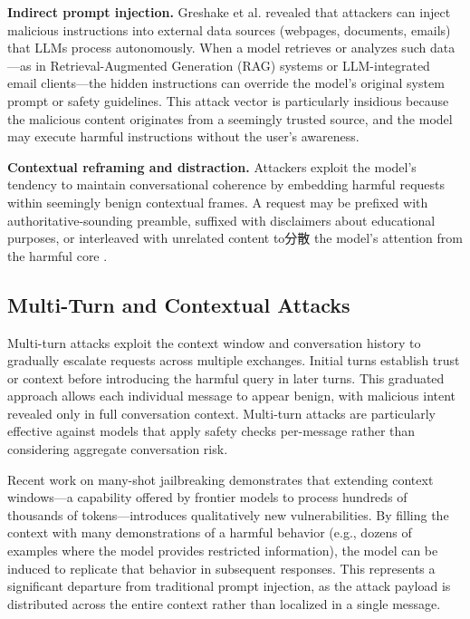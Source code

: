 \documentclass[conference]{IEEEtran}
\begin{document}
\textbf{Indirect prompt injection.} Greshake et al. \cite{greshake2023not} revealed that attackers can inject malicious instructions into external data sources (webpages, documents, emails) that LLMs process autonomously. When a model retrieves or analyzes such data---as in Retrieval-Augmented Generation (RAG) systems or LLM-integrated email clients---the hidden instructions can override the model's original system prompt or safety guidelines. This attack vector is particularly insidious because the malicious content originates from a seemingly trusted source, and the model may execute harmful instructions without the user's awareness.

\textbf{Contextual reframing and distraction.} Attackers exploit the model's tendency to maintain conversational coherence by embedding harmful requests within seemingly benign contextual frames. A request may be prefixed with authoritative-sounding preamble, suffixed with disclaimers about educational purposes, or interleaved with unrelated content to分散 the model's attention from the harmful core \cite{wei2023jailbroken}.

\subsection{Multi-Turn and Contextual Attacks}

Multi-turn attacks exploit the context window and conversation history to gradually escalate requests across multiple exchanges. Initial turns establish trust or context before introducing the harmful query in later turns. This graduated approach allows each individual message to appear benign, with malicious intent revealed only in full conversation context. Multi-turn attacks are particularly effective against models that apply safety checks per-message rather than considering aggregate conversation risk.

Recent work on many-shot jailbreaking \cite{anil2024manyshot} demonstrates that extending context windows---a capability offered by frontier models to process hundreds of thousands of tokens---introduces qualitatively new vulnerabilities. By filling the context with many demonstrations of a harmful behavior (e.g., dozens of examples where the model provides restricted information), the model can be induced to replicate that behavior in subsequent responses. This represents a significant departure from traditional prompt injection, as the attack payload is distributed across the entire context rather than localized in a single message.
\end{document}
